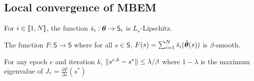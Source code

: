 \subsection{Local convergence of MBEM}
\begin{assumption}
For $i \in \llbracket1,N\rrbracket$,  the function $\bar{s}_i: \bm{\theta} \to \mathsf{S}_i$ is $L_s$-Lipschitz.
\end{assumption}

\begin{assumption}
The function $F: \mathsf{S} \to \mathsf{S}$ where for all $s \in  \mathsf{S}$, $F(s) = \sum_{i=1}^N \bar{s}_i (\hat{\bm{\theta}}(s))$ is $\beta$-smooth.
\end{assumption}
\begin{assumption}\label{ass:local}
For any epoch $e$ and iteration $k$, $\lVert s^{e,k} - s^*\rVert \leq \lambda/\beta$ where $1-\lambda$ is the maximum eigenvalue of $J_* = \frac{\partial F}{\partial s}(s^*)$ 
\end{assumption}

